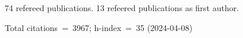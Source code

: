 74 refereed publications. 13 refeered publications as first author.

Total citations~=~3967; h-index~=~35 (2024-04-08)